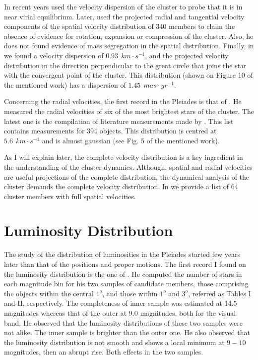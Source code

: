 In recent years \citet{Pinfield1998} used the velocity dispersion of the cluster to probe that it is in near virial equilibrium. Later, \citet{2006ARep...50..714L} used the projected radial and tangential velocity components of the spatial velocity distribution of 340 members to claim the absence of evidence for rotation, expansion or compression of the cluster. Also, he does not found evidence of mass segregation in the spatial distribution. Finally, in \citet{Galli2017} we found a velocity dispersion of $0.93 \ \ km\cdot s^{-1}$, and the projected velocity distribution in the direction perpendicular to the great circle that joins the star with the convergent point of the cluster. This distribution (shown on Figure 10 of the mentioned work) has a dispersion of $1.45 \ \ mas\cdot yr^{-1}$. 

Concerning the radial velocities, the first record in the Pleiades is that of \citet{1904ApJ....19..338A}. He measured the radial velocities of six of the most brightest stars of the cluster. The latest one is the compilation of literature measurements made by \citet{Galli2017}. This list contains measurements for 394 objects. This distribution is centred at $5.6\ \ km \cdot s^{-1}$ and is almost gaussian (see Fig. 5 of the mentioned work). 

As I will explain later, the complete velocity distribution is a key ingredient in the understanding of the cluster dynamics. Although, spatial and radial velocities are useful projections of the complete distribution, the dynamical analysis of the cluster demands the complete velocity distribution. In \citet{Galli2017} we provide a list of 64 cluster members with full spatial velocities. 
\section{Luminosity Distribution}

The study of the distribution of luminosities in the Pleiades started few years later than that of the positions and proper motions. The first record I found on the luminosity distribution is the one of \citet{Trumpler1921}. He computed the number of stars in each magnitude bin for his two samples of candidate members, those comprising the objects within the central $1^o$, and those within $1^o$ and $3^o$, referred as Tables I and II, respectively. The completeness of inner sample was estimated at 14.5 magnitudes whereas that of the outer at  9.0 magnitudes, both for the visual band. He observed that the luminosity distributions of these two samples were not alike. The inner sample is brighter than the outer one. He also observed that the luminosity distribution is not smooth and shows a local minimum at $9-10$ magnitudes, then an abrupt rise. Both effects in the two samples.

